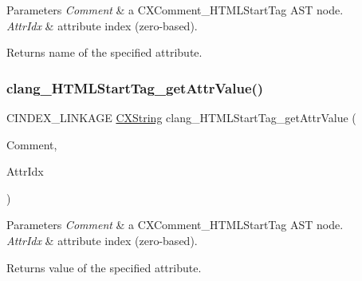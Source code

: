 \begin{DoxyParams}{Parameters}
{\em Comment} & a {\ttfamily C\+X\+Comment\+\_\+\+H\+T\+M\+L\+Start\+Tag} A\+ST node.\\
\hline
{\em Attr\+Idx} & attribute index (zero-\/based).\\
\hline
\end{DoxyParams}
\begin{DoxyReturn}{Returns}
name of the specified attribute. 
\end{DoxyReturn}
\mbox{\label{group__CINDEX__COMMENT_gae674a07af38d28d67941c1c54909c5e8}} 
\subsubsection{\texorpdfstring{clang\+\_\+\+H\+T\+M\+L\+Start\+Tag\+\_\+get\+Attr\+Value()}{clang\_HTMLStartTag\_getAttrValue()}}
{\footnotesize\ttfamily C\+I\+N\+D\+E\+X\+\_\+\+L\+I\+N\+K\+A\+GE \hyperlink{structCXString}{C\+X\+String} clang\+\_\+\+H\+T\+M\+L\+Start\+Tag\+\_\+get\+Attr\+Value (\begin{DoxyParamCaption}\item[{\hyperlink{structCXComment}{C\+X\+Comment}}]{Comment,  }\item[{unsigned}]{Attr\+Idx }\end{DoxyParamCaption})}


\begin{DoxyParams}{Parameters}
{\em Comment} & a {\ttfamily C\+X\+Comment\+\_\+\+H\+T\+M\+L\+Start\+Tag} A\+ST node.\\
\hline
{\em Attr\+Idx} & attribute index (zero-\/based).\\
\hline
\end{DoxyParams}
\begin{DoxyReturn}{Returns}
value of the specified attribute. 
\end{DoxyReturn}
\mbox{\label{group__CINDEX__COMMENT_gaffb8098debd5b99c2345840a5f0e63e0}} 
